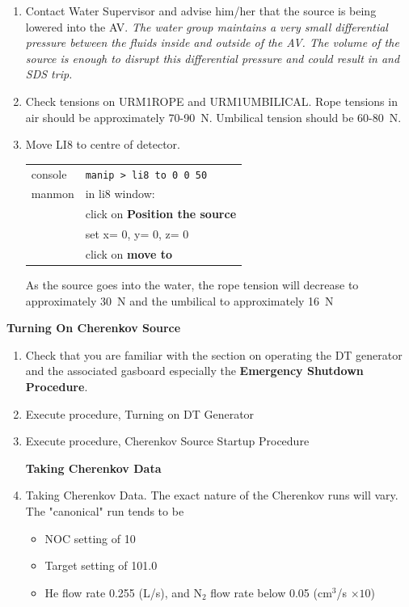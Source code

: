 \begin{enumerate}
\item \CheckBox[name=li8c1]{} Contact Water Supervisor and advise him/her that the source is being lowered into the AV. {\it The water group maintains a very small differential pressure between the fluids inside and outside of the AV. The volume of the source is enough to disrupt this differential pressure and could result in and SDS trip.}
\item \CheckBox[name=li8c2]{} Check tensions on URM1ROPE and
  URM1UMBILICAL. Rope tensions in air should be approximately 70-90~N. Umbilical tension should be 60-80~N.
\item \CheckBox[name=li8c3]{} Move LI8 to centre of detector.
	\begin{center}
	\begin{tabular}{|l|l|}
	\hline
	console & \verb+manip > li8 to 0 0 50+ \\
	manmon & in li8 window: \\
	& click on {\bf Position the source} \\
	& set x= 0, y= 0, z= 0 \\
	& click on {\bf move to} \\
	\hline
	\end{tabular}
	\end{center}
As the source goes into the water, the rope tension will decrease to approximately 30~N and the umbilical to approximately 16~N
\end{enumerate}

{\bf Turning On Cherenkov Source}

\begin{enumerate}
\item \CheckBox[name=li8t1]{} Check that you are familiar with the section on operating the DT generator and the associated gasboard especially the {\bf Emergency Shutdown Procedure}.
\item \CheckBox[name=li8t2]{} Execute procedure, Turning on DT Generator
\item \CheckBox[name=li8t3]{} Execute procedure, Cherenkov Source Startup Procedure

{\bf Taking Cherenkov Data}

\item \CheckBox[name=li8t4]{} Taking Cherenkov Data. The exact nature of the Cherenkov runs will vary. The "canonical" run tends to be 
\begin{itemize}
\item NOC setting of 10
\item Target setting of 101.0
\item He flow rate 0.255 (L/s), and N$_{2}$ flow rate below 0.05
  (cm$^{3}$/s $\times 10$)
\end{itemize}
\end{enumerate}

